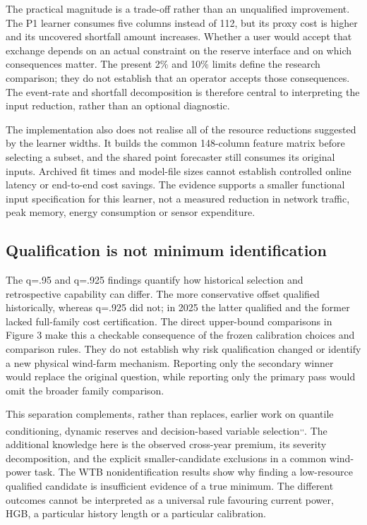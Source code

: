 \documentclass[
  british,
  11pt,
]{article}
\begin{document}
The practical magnitude is a trade-off rather than an unqualified
improvement. The P1 learner consumes five columns instead of 112, but
its proxy cost is higher and its uncovered shortfall amount increases.
Whether a user would accept that exchange depends on an actual
constraint on the reserve interface and on which consequences matter.
The present 2\% and 10\% limits define the research comparison; they do
not establish that an operator accepts those consequences. The
event-rate and shortfall decomposition is therefore central to
interpreting the input reduction, rather than an optional diagnostic.

The implementation also does not realise all of the resource reductions
suggested by the learner widths. It builds the common 148-column feature
matrix before selecting a subset, and the shared point forecaster still
consumes its original inputs. Archived fit times and model-file sizes
cannot establish controlled online latency or end-to-end cost savings.
The evidence supports a smaller functional input specification for this
learner, not a measured reduction in network traffic, peak memory,
energy consumption or sensor expenditure.

\subsection{Qualification is not minimum
identification}\label{qualification-is-not-minimum-identification}

The q=.95 and q=.925 findings quantify how historical selection and
retrospective capability can differ. The more conservative offset
qualified historically, whereas q=.925 did not; in 2025 the latter
qualified and the former lacked full-family cost certification. The
direct upper-bound comparisons in Figure 3 make this a checkable
consequence of the frozen calibration choices and comparison rules. They
do not establish why risk qualification changed or identify a new
physical wind-farm mechanism. Reporting only the secondary winner would
replace the original question, while reporting only the primary pass
would omit the broader family comparison.

This separation complements, rather than replaces, earlier work on
quantile conditioning, dynamic reserves and decision-based variable
selection\textsuperscript{,,}.
The additional knowledge here is the observed cross-year premium, its
severity decomposition, and the explicit smaller-candidate exclusions in
a common wind-power task. The WTB nonidentification results show why
finding a low-resource qualified candidate is insufficient evidence of a
true minimum. The different outcomes cannot be interpreted as a
universal rule favouring current power, HGB, a particular history length
or a particular calibration.
\end{document}
